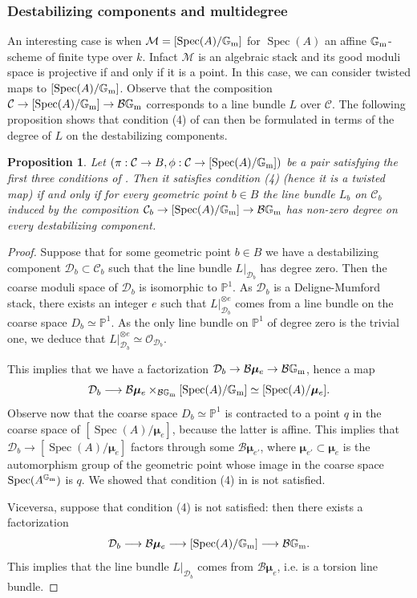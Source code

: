\documentclass{amsart}
\newcommand{\bG}{\mathbb{G}}
\newcommand{\bP}{\mathbb{P}}
\newcommand{\cB}{\mathcal{B}}
\newcommand{\cC}{\mathcal{C}}
\newcommand{\cD}{\mathcal{D}}
\newcommand{\cM}{\mathcal{M}}
\newcommand{\cO}{\mathcal{O}}
\newcommand{\spec}{\operatorname{Spec}}
\newcommand{\Gm}{\bG_{{\rm m}}}
\newcommand{\bmu}{\bm{\mu}}
\newtheorem{Prop}[theorem]{Proposition}
\theoremstyle{definition}
\begin{document}
\subsubsection{Destabilizing components and multidegree}
An interesting case is when $\cM = [\spec(A)/\Gm]$ for $\spec(A)$ an affine $\Gm$-scheme of finite type over $k$. Infact $\cM$ is an algebraic stack and its good moduli space is projective if and only if it is a point. In this case, we can consider twisted maps to $[\spec(A)/\Gm]$.
Observe that the composition $\cC\to [\spec(A)/\Gm]\to \cB\Gm$ corresponds to a line bundle $L$ over $\cC$. The following proposition shows that condition (4) of  can then be formulated in terms of the degree of $L$ on the destabilizing components.
\begin{Prop}\label{prop degree 0 = factors through bmuk}
Let $(\pi:\cC\to B,\phi:\cC\to [\spec(A)/\Gm])$ be a pair satisfying the first three conditions of . Then it satisfies condition (4) (hence it is a twisted map) if and only if for every geometric point $b\in B$ the line bundle $L_b$ on $\cC_b$ induced by the composition $\cC_b\to [\spec(A)/\Gm]\to \cB\Gm$ has non-zero degree on every destabilizing component.
\end{Prop}
\begin{proof}
Suppose that for some geometric point $b\in B$ we have a destabilizing component $\cD_b\subset \cC_b$ such that the line bundle $L|_{\cD_b}$ has degree zero. Then the coarse moduli space of $\cD_b$ is isomorphic to $\bP^1$. As $\cD_b$ is a Deligne-Mumford stack, there exists an integer $e$ such that $L|_{\cD_b}^{\otimes e}$ comes from a line bundle on the coarse space $D_b\simeq\bP^1$. As the only line bundle on $\bP^1$ of degree zero is the trivial one, we deduce that $L|_{\cD_b}^{\otimes e}\simeq \cO_{\cD_b}$.

This implies that we have a factorization $\cD_b\to \cB\bmu_{e}\to \cB\Gm$, hence a map 
\[ \cD_b\longrightarrow \cB\bmu_e\times_{\cB\Gm}[\spec(A)/\Gm]\simeq [\spec(A)/\bmu_e]. \]
Observe now that the coarse space $D_b\simeq\bP^1$ is contracted to a point $q$ in the coarse space of $[\spec(A)/\bmu_e]$, because the latter is affine. This implies that $\cD_b\to [\spec(A)/\bmu_e] $ factors through some $\cB\bmu_{e'}$, where $\bmu_{e'}\subset \bmu_{e}$ is the automorphism group of the geometric point whose image in the coarse space $\spec(A^{\Gm})$ is $q$. We showed that condition (4) in  is not satisfied.

Viceversa, suppose that condition (4) is not satisfied: then there exists a factorization 
\[\cD_b \longrightarrow \cB\bmu_{e} \longrightarrow [\spec(A)/\Gm] \longrightarrow \cB\Gm. \]
This implies that the line bundle $L|_{\cD_b}$ comes from $\cB\bmu_{e}$, i.e. is a torsion line bundle.
\end{proof}
\end{document}

